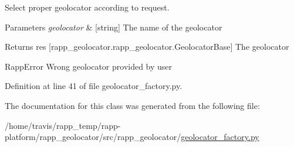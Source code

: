 Select proper geolocator according to request. 


\begin{DoxyParams}{Parameters}
{\em geolocator} & \mbox{[}string\mbox{]} The name of the geolocator\\
\hline
\end{DoxyParams}
\begin{DoxyReturn}{Returns}
res \mbox{[}rapp\-\_\-geolocator.\-rapp\-\_\-geolocator.\-Geolocator\-Base\mbox{]} The geolocator
\end{DoxyReturn}
Rapp\-Error Wrong geolocator provided by user 

Definition at line 41 of file geolocator\-\_\-factory.\-py.



The documentation for this class was generated from the following file\-:\begin{DoxyCompactItemize}
\item 
/home/travis/rapp\-\_\-temp/rapp-\/platform/rapp\-\_\-geolocator/src/rapp\-\_\-geolocator/\hyperlink{geolocator__factory_8py}{geolocator\-\_\-factory.\-py}\end{DoxyCompactItemize}
